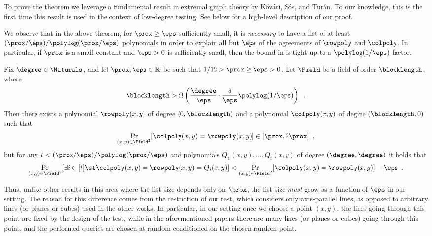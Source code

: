 \documentclass{toc}
\theoremstyle{plain}
\begin{document}
To prove the theorem we leverage a fundamental result in extremal graph theory by %
K\H{o}v\'{a}ri,    %
S\'{o}s, and Tur\'{a}n.
To our knowledge, this is the first time this result is used in the context of low-degree testing.
See  below for a high-level description of our proof.

We observe that in the above theorem, for $\prox \geq \eps$ sufficiently small, it is \emph{necessary} to have a
list of at least ${(\prox/\eps)}/{\polylog(\prox/\eps)}$ polynomials in order to explain all but $\eps$ of the agreements of $\rowpoly$ and $\colpoly$.
In particular, if $\prox$ is a small constant and $\eps>0$ is sufficiently small,
then the bound in  is tight up to a $\polylog(1/\eps)$ factor.

\begin{proposition}
\label{prop:list size lb}
Fix $\degree \in \Naturals$, and let $\prox, \eps \in \mathbb R$ be such that ${1}/{12} > \prox \geq \eps > 0$. Let $\Field$ be a field of
%
order   %
$\blocklength$, where
\[
  \blocklength > \Omega\left( \frac{\degree}{\eps} \cdot \frac{\delta}{\eps} \polylog({1}/{\eps})\right)\enspace.
\]
Then there exists a polynomial $\rowpoly(x,y)$ of degree
$(0,\blocklength)$ and a polynomial $\colpoly(x,y)$ of degree
$(\blocklength,0)$ such that
\begin{equation*}
\Pr_{(x,y) \in \Field^2}[\colpoly(x,y) = \rowpoly(x,y)] \in [\prox,2\prox] \enspace,
\end{equation*}
but for any $t < {(\prox/\eps)}/{\polylog(\prox/\eps)}$ and polynomials $Q_1(x,y),\dots,Q_t(x,y)$ of degree $(\degree,\degree)$ it holds that
\begin{equation*}
\Pr_{(x,y) \in \Field^2}
[\exists i \in [t] \st \colpoly(x,y) = \rowpoly(x,y)= Q_i(x,y)]
< \Pr_{(x,y) \in \Field^2}[\colpoly(x,y) = \rowpoly(x,y)] - \eps \enspace.
\end{equation*}
\end{proposition}

Thus, unlike other results in this area \cite{RazS97, AroraS03, BhangaleDN17} where the list size depends only on $\prox$, the list size \emph{must} grow as a function of $\eps$ in our setting. The reason for this difference comes from the restriction of our test, which considers only axis-parallel lines, as opposed to arbitrary lines (or planes or cubes) used in the other works. In particular, in our setting once we choose a point $(x,y)$, the lines going through this point are fixed by the design of the test, while in the
%
aforementioned papers  %
there are many lines (or planes or cubes) going through this point, and the performed queries are chosen at random conditioned on the chosen random point.
\end{document}
